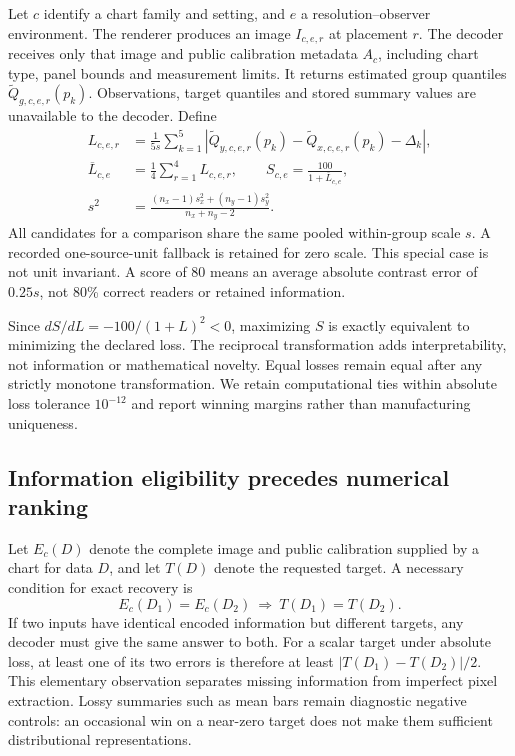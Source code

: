 \documentclass[11pt]{article}
\begin{document}
Let $c$ identify a chart family and setting, and $e$ a resolution--observer environment. The renderer produces an image $I_{c,e,r}$ at placement $r$. The decoder receives only that image and public calibration metadata $A_c$, including chart type, panel bounds and measurement limits. It returns estimated group quantiles $\widetilde Q_{g,c,e,r}(p_k)$. Observations, target quantiles and stored summary values are unavailable to the decoder. Define
\begin{align}
L_{c,e,r}&=\frac{1}{5s}\sum_{k=1}^5|\widetilde Q_{y,c,e,r}(p_k)-\widetilde Q_{x,c,e,r}(p_k)-\Delta_k|,\\
\overline L_{c,e}&=\frac14\sum_{r=1}^4L_{c,e,r},\qquad S_{c,e}=\frac{100}{1+\overline L_{c,e}},\label{eq:score}\\
s^2&=\frac{(n_x-1)s_x^2+(n_y-1)s_y^2}{n_x+n_y-2}.
\end{align}
All candidates for a comparison share the same pooled within-group scale $s$. A recorded one-source-unit fallback is retained for zero scale. This special case is not unit invariant. A score of 80 means an average absolute contrast error of $0.25s$, not 80\% correct readers or retained information.

Since $dS/dL=-100/(1+L)^2<0$, maximizing $S$ is exactly equivalent to minimizing the declared loss. The reciprocal transformation adds interpretability, not information or mathematical novelty. Equal losses remain equal after any strictly monotone transformation. We retain computational ties within absolute loss tolerance $10^{-12}$ and report winning margins rather than manufacturing uniqueness.

\subsection*{Information eligibility precedes numerical ranking}
Let $E_c(D)$ denote the complete image and public calibration supplied by a chart for data $D$, and let $T(D)$ denote the requested target. A necessary condition for exact recovery is
\[
 E_c(D_1)=E_c(D_2)\ \Longrightarrow\ T(D_1)=T(D_2).
\]
If two inputs have identical encoded information but different targets, any decoder must give the same answer to both. For a scalar target under absolute loss, at least one of its two errors is therefore at least $|T(D_1)-T(D_2)|/2$. This elementary observation separates missing information from imperfect pixel extraction. Lossy summaries such as mean bars remain diagnostic negative controls: an occasional win on a near-zero target does not make them sufficient distributional representations.
\end{document}
